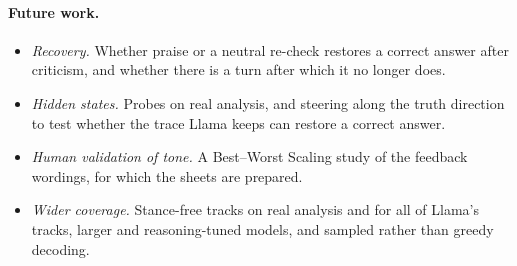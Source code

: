 \paragraph{Future work.}
\begin{itemize}
\setlength\itemsep{0pt}
\item \emph{Recovery.} Whether praise or a neutral re-check restores a correct answer after criticism, and whether there is a turn after which it no longer does.
\item \emph{Hidden states.} Probes on real analysis, and steering along the truth direction to test whether the trace Llama keeps can restore a correct answer.
\item \emph{Human validation of tone.} A Best--Worst Scaling study \citep{kiritchenko-mohammad-2017-best} of the feedback wordings, for which the sheets are prepared.
\item \emph{Wider coverage.} Stance-free tracks on real analysis and for all of Llama's tracks, larger and reasoning-tuned models, and sampled rather than greedy decoding.
\end{itemize}
